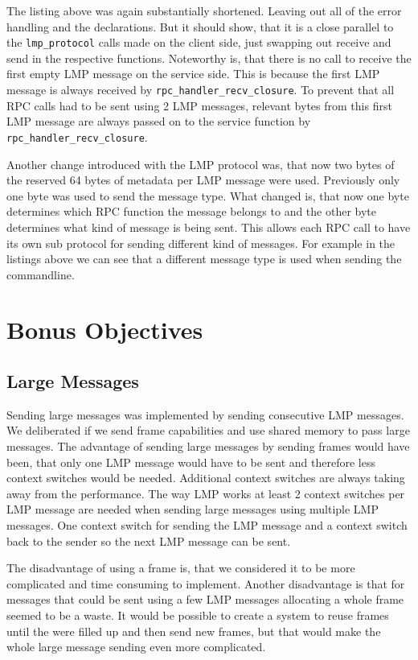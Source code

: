 The listing above was again substantially shortened. Leaving out all of the error handling and the declarations. But it should show, that it is a close parallel to the \verb|lmp_protocol| calls made on the client side, just swapping out receive and send in the respective functions.
Noteworthy is, that there is no call to receive the first empty LMP message on the service side. This is because the first LMP message is always received by \verb|rpc_handler_recv_closure|. To prevent that all RPC calls had to be sent using 2 LMP messages, relevant bytes from this first LMP message are always passed on to the service function by \verb|rpc_handler_recv_closure|.

Another change introduced with the LMP protocol was, that now two bytes of the reserved 64 bytes of metadata per LMP message were used. Previously only one byte was used to send the message type. What changed is, that now one byte determines which RPC function the message belongs to and the other byte determines what kind of message is being sent. This allows each RPC call to have its own sub protocol for sending different kind of messages. For example in the listings above we can see that a different message type is used when sending the commandline.

\section{Bonus Objectives}

\subsection{Large Messages}
Sending large messages was implemented by sending consecutive LMP messages. We deliberated if we send frame capabilities and use shared memory to pass large messages. The advantage of sending large messages by sending frames would have been, that only one LMP message would have to be sent and therefore less context switches would be needed. Additional context switches are always taking away from the performance. The way LMP works at least 2 context switches per LMP message are needed when sending large messages using multiple LMP messages. One context switch for sending the LMP message and a context switch back to the sender so the next LMP message can be sent.

The disadvantage of using a frame is, that we considered it to be more complicated and time consuming to implement. Another disadvantage is that for messages that could be sent using a few LMP messages allocating a whole frame seemed to be a waste. It would be possible to create a system to reuse frames until the were filled up and then send new frames, but that would make the whole large message sending even more complicated.

